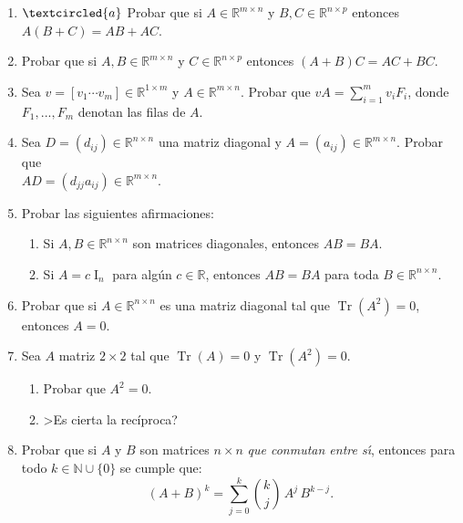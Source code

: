 \begin{enumerate}[resume, topsep=6pt, itemsep=.4cm]


\item\label{ej: distributiva} $\textcircled{a}$ Probar que si $A\in\mathbb{R}^{m\times n}$ y $B,C\in\mathbb{R}^{n\times p}$ entonces
$A(B+ C)=AB + AC$.

\item Probar que si $A,B\in\mathbb{R}^{m\times n}$ y $C\in\mathbb{R}^{n\times p}$ entonces
$(A+B)C = AC + BC$.

\item Sea $v=[v_1 \cdots v_m]\in\mathbb{R}^{1\times m}$ y $A\in\mathbb{R}^{m\times n}$. Probar que $vA=\sum_{i=1}^m v_iF_i$, donde $F_1, ..., F_m$ denotan las filas de $A$.

\item Sea $D=(d_{ij})\in\mathbb{R}^{n\times n}$ una matriz diagonal y $A=(a_{ij})\in\mathbb{R}^{m\times n}$. Probar que \\ $AD=(d_{jj}a_{ij})\in\mathbb{R}^{m\times n}$.

\item
Probar las siguientes afirmaciones:
\begin{enumerate}[topsep=5pt,itemsep=5pt]
\item Si $A,B\in\mathbb{R}^{n\times n}$ son matrices diagonales, entonces $AB=BA$.
\item Si $A=c \operatorname{I}_n$ para alg\'un $c \in \mathbb{R}$, entonces $AB=BA$ para toda $B\in\mathbb{R}^{n\times n}$.
\end{enumerate}

\item Probar que si $A\in\mathbb{R}^{n\times n}$ es una matriz diagonal tal que $\operatorname{Tr} (A^2)=0$, entonces $A=0$.

\item Sea $A$ matriz $2\times 2$  tal que $\operatorname{Tr}(A)=0$ y $\operatorname{Tr}(A^2)=0$.

\begin{enumerate}[topsep=5pt,itemsep=5pt]
    \item  Probar que $A^2 = 0$.
    \item   >Es cierta la rec\'iproca?
\end{enumerate}


\item Probar que si $A$ y $B$ son matrices $n \times n$ \emph{que conmutan entre s\' \i}, entonces para todo $k \in \mathbb N \cup \{0\}$ se cumple que:
$$(A+B)^k = \sum_{j = 0}^k \binom{k}{j} \, A^j \, B^{k-j}.$$


\end{enumerate}
